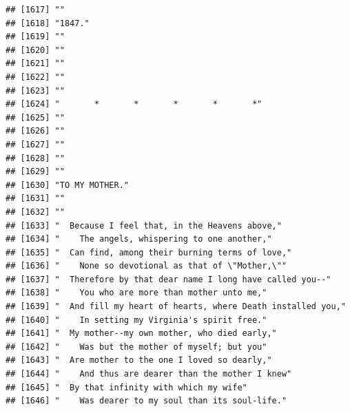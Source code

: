 \documentclass{article}\usepackage[]{graphicx}\usepackage[]{color}
\makeatletter
\newenvironment{kframe}{%
 \def\at@end@of@kframe{}%
 \ifinner\ifhmode%
  \def\at@end@of@kframe{\end{minipage}}%
  \begin{minipage}{\columnwidth}%
 \fi\fi%
 \def\FrameCommand##1{\hskip\@totalleftmargin \hskip-\fboxsep
 \colorbox{shadecolor}{##1}\hskip-\fboxsep
     \hskip-\linewidth \hskip-\@totalleftmargin \hskip\columnwidth}%
 \MakeFramed {\advance\hsize-\width
   \@totalleftmargin\z@ \linewidth\hsize
   \@setminipage}}%
 {\par\unskip\endMakeFramed%
 \at@end@of@kframe}
\newenvironment{knitrout}{}{} %
\makeatother
\begin{document}
\begin{knitrout}
\begin{kframe}
\begin{verbatim}
## [1617] ""                                                                            
## [1618] "1847."                                                                       
## [1619] ""                                                                            
## [1620] ""                                                                            
## [1621] ""                                                                            
## [1622] ""                                                                            
## [1623] ""                                                                            
## [1624] "       *       *       *       *       *"                                    
## [1625] ""                                                                            
## [1626] ""                                                                            
## [1627] ""                                                                            
## [1628] ""                                                                            
## [1629] ""                                                                            
## [1630] "TO MY MOTHER."                                                               
## [1631] ""                                                                            
## [1632] ""                                                                            
## [1633] "  Because I feel that, in the Heavens above,"                                
## [1634] "    The angels, whispering to one another,"                                  
## [1635] "  Can find, among their burning terms of love,"                              
## [1636] "    None so devotional as that of \"Mother,\""                               
## [1637] "  Therefore by that dear name I long have called you--"                      
## [1638] "    You who are more than mother unto me,"                                   
## [1639] "  And fill my heart of hearts, where Death installed you,"                   
## [1640] "    In setting my Virginia's spirit free."                                   
## [1641] "  My mother--my own mother, who died early,"                                 
## [1642] "    Was but the mother of myself; but you"                                   
## [1643] "  Are mother to the one I loved so dearly,"                                  
## [1644] "    And thus are dearer than the mother I knew"                              
## [1645] "  By that infinity with which my wife"                                       
## [1646] "    Was dearer to my soul than its soul-life."                               

\end{verbatim}
\end{kframe}
\end{knitrout}
\end{document}
